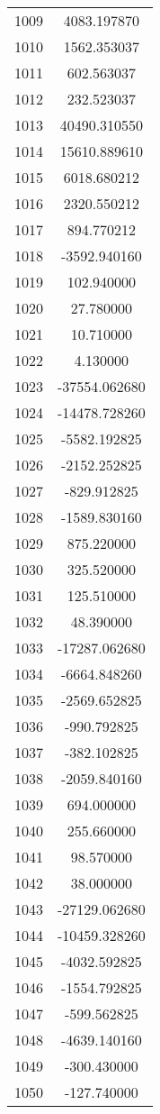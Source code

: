 \documentclass[12pt]{article}
\begin{document}
\begin{longtable}{@{}cc@{}}
1009 & 4083.197870 \\
1010 & 1562.353037 \\
1011 & 602.563037 \\
1012 & 232.523037 \\
1013 & 40490.310550 \\
1014 & 15610.889610 \\
1015 & 6018.680212 \\
1016 & 2320.550212 \\
1017 & 894.770212 \\
1018 & -3592.940160 \\
1019 & 102.940000 \\
1020 & 27.780000 \\
1021 & 10.710000 \\
1022 & 4.130000 \\
1023 & -37554.062680 \\
1024 & -14478.728260 \\
1025 & -5582.192825 \\
1026 & -2152.252825 \\
1027 & -829.912825 \\
1028 & -1589.830160 \\
1029 & 875.220000 \\
1030 & 325.520000 \\
1031 & 125.510000 \\
1032 & 48.390000 \\
1033 & -17287.062680 \\
1034 & -6664.848260 \\
1035 & -2569.652825 \\
1036 & -990.792825 \\
1037 & -382.102825 \\
1038 & -2059.840160 \\
1039 & 694.000000 \\
1040 & 255.660000 \\
1041 & 98.570000 \\
1042 & 38.000000 \\
1043 & -27129.062680 \\
1044 & -10459.328260 \\
1045 & -4032.592825 \\
1046 & -1554.792825 \\
1047 & -599.562825 \\
1048 & -4639.140160 \\
1049 & -300.430000 \\
1050 & -127.740000 \\

\end{longtable}
\end{document}

